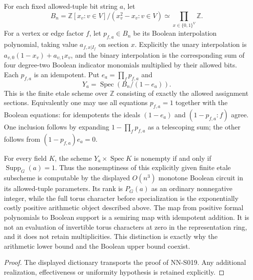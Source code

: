 \begin{geometricstatement}[NN-S019]
For each fixed allowed-tuple bit string $a$, let
\[
 B_n=\mathbb Z[x_v:v\in V]/(x_v^2-x_v:v\in V)
                   \simeq\prod_{x\in\{0,1\}^V}\mathbb Z.
\]
For a vertex or edge factor $f$, let $p_{f,a}\in B_n$ be its
Boolean interpolation polynomial, taking value $a_{f,x|I_f}$
on section $x$.  Explicitly the unary interpolation is
$a_{v,0}(1-x_v)+a_{v,1}x_v$, and the binary interpolation is
the corresponding sum of four degree-two Boolean indicator
monomials multiplied by their allowed bits.  Each $p_{f,a}$
is an idempotent.  Put $e_a=\prod_f p_{f,a}$ and
\[
                 Y_a=\operatorname{Spec}(B_n/(1-e_a)).
\]
This is the finite etale scheme over $\mathbb Z$ consisting of
exactly the allowed assignment sections.  Equivalently one may
use all equations $p_{f,a}=1$ together with the Boolean equations:
for idempotents the ideals $(1-e_a)$ and $(1-p_{f,a}:f)$ agree.
One inclusion follows by expanding $1-\prod_f p_{f,a}$ as a
telescoping sum; the other follows from
$(1-p_{f,a})e_a=0$.

For every field $K$, the scheme $Y_a\times\operatorname{Spec}K$
is nonempty if and only if $\operatorname{Supp}_G(a)=1$.
Thus the nonemptiness of this explicitly given finite etale
subscheme is computable by the displayed $O(n^3)$ monotone
Boolean circuit in its allowed-tuple parameters.  Its rank is
$P_G(a)$ as an ordinary nonnegative integer, while the full
torus character before specialization is the exponentially
costly positive arithmetic object described above.  The map
from positive formal polynomials to Boolean support is a
semiring map with idempotent addition.  It is not an evaluation
of invertible torus characters at zero in the representation
ring, and it does not retain multiplicities.  This distinction
is exactly why the arithmetic lower bound and the Boolean
upper bound coexist.
\end{geometricstatement}
\begin{proof} The displayed dictionary transports the proof of NN-S019. Any additional realization, effectiveness or uniformity hypothesis is retained explicitly.\end{proof}
